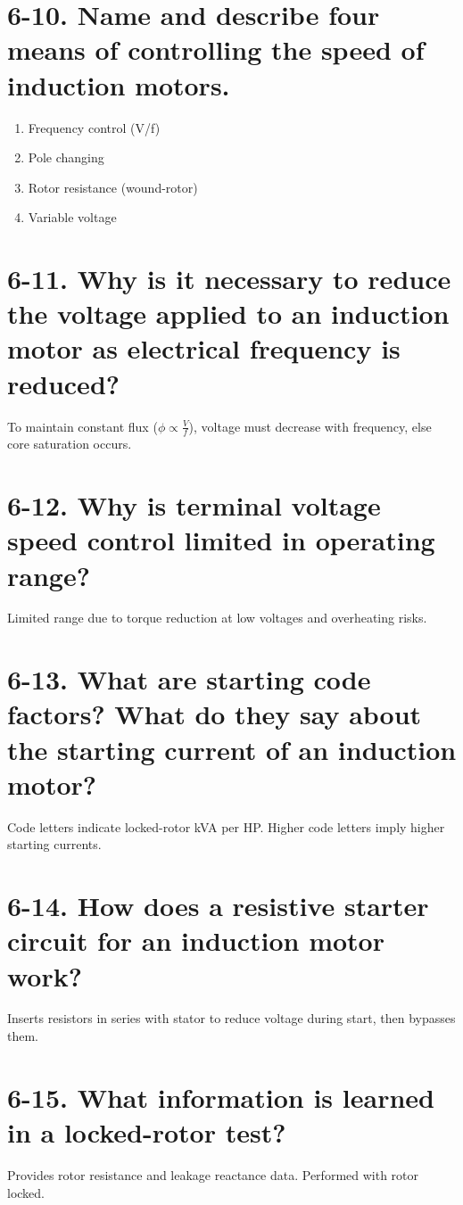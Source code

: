 \documentclass[a4paper,12pt]{article}
\begin{document}
\section*{6-10. Name and describe four means of controlling the speed of induction motors.}
\begin{enumerate}
	\item Frequency control (V/f)
	\item Pole changing
	\item Rotor resistance (wound-rotor)
	\item Variable voltage
\end{enumerate}

\section*{6-11. Why is it necessary to reduce the voltage applied to an induction motor as electrical frequency is reduced?}
To maintain constant flux ($\phi \propto \frac{V}{f}$), voltage must decrease with frequency, else core saturation occurs.

\section*{6-12. Why is terminal voltage speed control limited in operating range?}
Limited range due to torque reduction at low voltages and overheating risks.

\section*{6-13. What are starting code factors? What do they say about the starting current of an induction motor?}
Code letters indicate locked-rotor kVA per HP. Higher code letters imply higher starting currents.

\section*{6-14. How does a resistive starter circuit for an induction motor work?}
Inserts resistors in series with stator to reduce voltage during start, then bypasses them.

\section*{6-15. What information is learned in a locked-rotor test?}
Provides rotor resistance and leakage reactance data. Performed with rotor locked.
\end{document}
